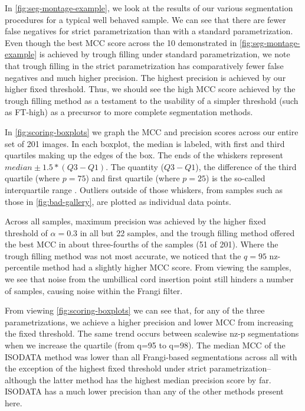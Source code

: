 In \cref{fig:seg-montage-example}, we look at the results of our various segmentation procedures for a typical well behaved sample. We can see that there are fewer false negatives for strict parametrization than with a standard parametrization. Even though the best MCC score across the 10 demonstrated in \cref{fig:seg-montage-example} is achieved by trough filling under standard parametrization, we note that trough filling in the strict parametrization has comparatively fewer false negatives and much higher precision. The highest precision is achieved by our higher fixed threshold. Thus, we should see the high MCC score achieved by the trough filling method as a testament to the usability of a simpler threshold (such as FT-high) as a precursor to more complete segmentation methods.


In \cref{fig:scoring-boxplots} we graph the MCC and precision scores across our entire set of 201 images. In each boxplot, the median is labeled, with first and third quartiles making up the edges of the box. The ends of the whiskers represent  $median \pm 1.5*(Q3-Q1)$. The quantity ($Q3-Q1$), the difference of the third quartile (where $p=75$) and first quartile (where $p=25$) is the so-called interquartile range \autocite{scipy}. Outliers outside of those whiskers, from samples such as those in \cref{fig:bad-gallery}, are plotted as individual data points.

Across all samples, maximum precision was achieved by the higher fixed threshold of $\alpha =0.3 $ in all but 22 samples, and the trough filling method offered the best MCC in about three-fourths of the samples (51 of 201). Where the trough filling method was not most accurate, we noticed that the $q=95 $ nz-percentile method had a slightly higher MCC score. From viewing the samples, we see that noise from the umbillical cord insertion point still hinders a number of samples, causing noise within the Frangi filter. 

From viewing \cref{fig:scoring-boxplots} we can see that, for any of the
three parametrizations, we achieve a higher precision and lower MCC from increasing the fixed threshold. The same trend occurs between scalewise nz-p segmentations when we increase the quartile (from q=95 to q=98). The median MCC of the ISODATA method was lower than all Frangi-based segmentations across all with the exception of the highest fixed threshold under strict parametrization--although the latter method has the highest median precision score by far. ISODATA has a much lower precision than any of the other methods present here.

